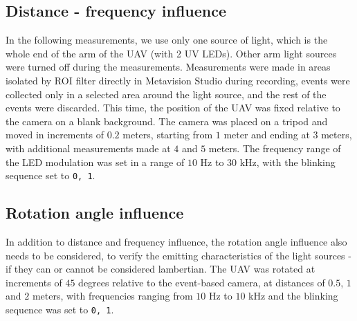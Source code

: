 \subsection{Distance - frequency influence}

In the following measurements, we use only one source of light, which is the whole end of the arm of the \ac{UAV} (with 2 \ac{UV} \ac{LED}s). Other arm light sources were turned off during the measurements.
Measurements were made in areas isolated by \ac{ROI} filter directly in Metavision Studio during recording, events were collected only in a
selected area around the light source, and the
rest of the events were discarded.
This time, the position of the \ac{UAV} was fixed relative to the camera on a blank background. The camera was placed on a tripod
and moved in increments of $0.2$ meters, starting from $1$ meter and ending at $3$ meters, with additional measurements made
at $4$ and $5$ meters.
The frequency range of the LED modulation was set in a range of $10$ Hz to $30$ kHz, with the blinking sequence set to \texttt{0, 1}.

\subsection{Rotation angle influence}

In addition to distance and frequency influence, the rotation angle influence also needs to be considered, to
verify the emitting characteristics of the light sources - if they can or cannot be considered lambertian.
The \ac{UAV} was rotated at increments of $45$ degrees relative to the event-based camera, at distances of $0.5$, $1$ and $2$ meters,
with frequencies ranging from $10$ Hz to $10$ kHz and the blinking sequence was set to \texttt{0, 1}.



